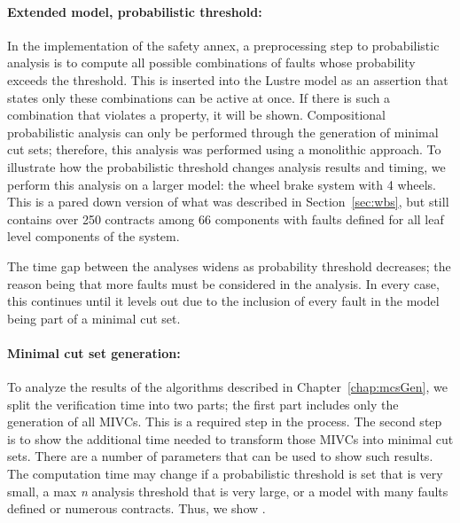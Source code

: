 \paragraph{Extended model, probabilistic threshold:} In the implementation of the safety annex, a preprocessing step to probabilistic analysis is to compute all possible combinations of faults whose probability exceeds the threshold. This is inserted into the Lustre model as an assertion that states only these combinations can be active at once. If there is such a combination that violates a property, it will be shown. Compositional probabilistic analysis can only be performed through the generation of minimal cut sets; therefore, this analysis was performed using a monolithic approach. To illustrate how the probabilistic threshold changes analysis results and timing, we perform this analysis on a larger model: the wheel brake system with 4 wheels. This is a pared down version of what was described in Section~\ref{sec:wbs}, but still contains over 250 contracts among 66 components with faults defined for all leaf level components of the system. 


The time gap between the analyses widens as probability threshold decreases; the reason being that more faults must be considered in the analysis. In every case, this continues until it levels out due to the inclusion of every fault in the model being part of a minimal cut set. 

\paragraph{Minimal cut set generation:} To analyze the results of the algorithms described in Chapter~\ref{chap:mcsGen}, we split the verification time into two parts; the first part includes only the generation of all MIVCs. This is a required step in the process. The second step is to show the additional time needed to transform those MIVCs into minimal cut sets. There are a number of parameters that can be used to show such results. The computation time may change if a probabilistic threshold is set that is very small, a max \textit{n} analysis threshold that is very large, or a model with many faults defined or numerous contracts. Thus, we show .
 








